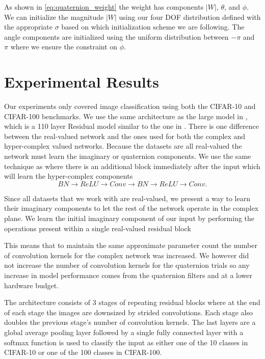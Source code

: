 \documentclass[14pt,a4paper]{article}
\begin{document}
As shown in \eqref{eq:quaternion_weight} the weight has components $|W|$, $\theta$, and $\phi$. 
We can initialize the magnitude $|W|$ using our four DOF distribution defined with the appropriate $\sigma$ based on which initialization scheme we are following. 
The angle components are initialized using the uniform distribution between $-\pi$ and $\pi$ where we ensure the constraint on $\phi$.


\section{Experimental Results}
Our experiments only covered image classification using both the CIFAR-10 and CIFAR-100 benchmarks.
We use the same architecture as the large model in \cite{trabelsi2017deep}, which is a 110 layer Residual model similar to the one in \cite{he2016deep}.
There is one difference between the real-valued network and the ones used for both the complex and hyper-complex valued networks.
Because the datasets are all real-valued the network must learn the imaginary or quaternion components.
We use the same technique as \cite{trabelsi2017deep} where there is an additional block immediately after the input which will learn the hyper-complex components
\begin{equation*}
BN \rightarrow ReLU \rightarrow Conv \rightarrow BN \rightarrow ReLU \rightarrow Conv.
\end{equation*}

Since all datasets that we work with are real-valued,
we present a way to learn their imaginary components to let the rest of the network operate in the
complex plane. We learn the initial imaginary component of our input by performing the operations
present within a single real-valued residual block

This means that to maintain the same approximate parameter count the number of convolution kernels for the complex network was increased.
We however did not increase the number of convolution kernels for the quaternion trials so any increase in model performance comes from the quaternion filters and at a lower hardware budget.

The architecture consists of 3 stages of repeating residual blocks where at the end of each stage the images are downsized by strided convolutions.
Each stage also doubles the previous stage's number of convolution kernels.
The last layers are a global average pooling layer followed by a single fully connected layer with a softmax function is used to classify the input as either one of the 10 classes in CIFAR-10 or one of the 100 classes in CIFAR-100.
\end{document}

